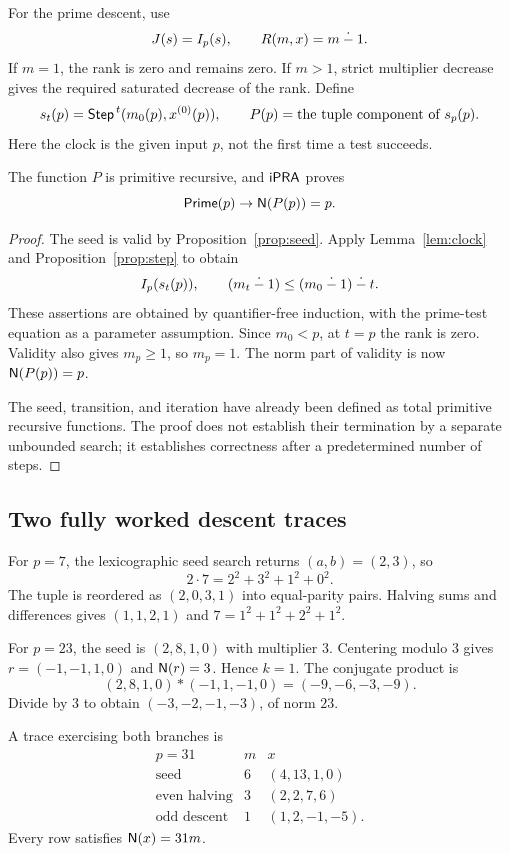 For the prime descent, use
\[
 J(s)=I_p(s),\qquad R(m,x)=m\mathbin{\dot{-}}1.
\]
If $m=1$, the rank is zero and remains zero. If $m>1$, strict multiplier
decrease gives the required saturated decrease of the rank. Define
\begin{equation}
\label{eq:primeprog}
 s_t(p)=\mathsf{Step}^{\,t}(m_0(p),x^{(0)}(p)),\qquad
 P(p)=\text{the tuple component of }s_p(p).
\end{equation}
Here the clock is the given input $p$, not the first time a test succeeds.

\begin{theorem}
\label{thm:prime}
The function $P$ is primitive recursive, and $\mathsf{iPRA}$ proves
\[
 \mathsf{Prime}(p)\to\mathsf N(P(p))=p.
\]
\end{theorem}

\begin{proof}
The seed is valid by Proposition~\ref{prop:seed}. Apply
Lemma~\ref{lem:clock} and Proposition~\ref{prop:step} to obtain
\[
 I_p(s_t(p)),\qquad
 (m_t\mathbin{\dot{-}}1)\le(m_0\mathbin{\dot{-}}1)\mathbin{\dot{-}} t.
\]
These assertions are obtained by quantifier-free induction, with the
prime-test equation as a parameter assumption. Since $m_0<p$, at $t=p$
the rank is zero. Validity also gives $m_p\ge1$, so $m_p=1$. The norm
part of validity is now $\mathsf N(P(p))=p$.

The seed, transition, and iteration have already been defined as total
primitive recursive functions. The proof does not establish their
termination by a separate unbounded search; it establishes correctness
after a predetermined number of steps.
\end{proof}

\subsection{Two fully worked descent traces}

For $p=7$, the lexicographic seed search returns $(a,b)=(2,3)$, so
\[
 2\cdot7=2^2+3^2+1^2+0^2.
\]
The tuple is reordered as $(2,0,3,1)$ into equal-parity pairs. Halving
sums and differences gives $(1,1,2,1)$ and
$7=1^2+1^2+2^2+1^2$.

For $p=23$, the seed is $(2,8,1,0)$ with multiplier $3$. Centering modulo
$3$ gives $r=(-1,-1,1,0)$ and $\mathsf N(r)=3$. Hence $k=1$.
The conjugate product is
\[
 (2,8,1,0)*(-1,1,-1,0)=(-9,-6,-3,-9).
\]
Divide by $3$ to obtain $(-3,-2,-1,-3)$, of norm $23$.

A trace exercising both branches is
\[
 \begin{array}{c|c|c}
 p=31&m&x\\\hline
 \text{seed}&6&(4,13,1,0)\\
 \text{even halving}&3&(2,2,7,6)\\
 \text{odd descent}&1&(1,2,-1,-5).
 \end{array}
\]
Every row satisfies $\mathsf N(x)=31m$.
